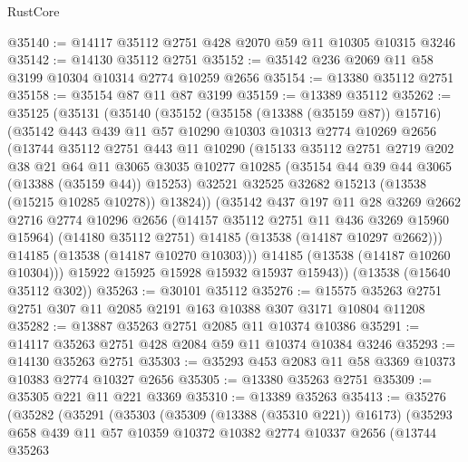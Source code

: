 \begin{lexlean}{RustCore}
\begin{coremodule}
@35140 := @14117 @35112 @2751 @428 @2070 @59 @11 @10305 @10315 @3246
@35142 := @14130 @35112 @2751
@35152 := @35142 @236 @2069 @11 @58 @3199 @10304 @10314 @2774 @10259 @2656
@35154 := @13380 @35112 @2751
@35158 := @35154 @87 @11 @87 @3199
@35159 := @13389 @35112
@35262 := @35125
    (@35131
      (@35140
        (@35152
          (@35158 (@13388 (@35159 @87)) @15716)
          (@35142
            @443
            @439
            @11
            @57
            @10290
            @10303
            @10313
            @2774
            @10269
            @2656
            (@13744
              @35112
              @2751
              @443
              @11
              @10290
              (@15133
                @35112
                @2751
                @2719
                @202
                @38
                @21
                @64
                @11
                @3065
                @3035
                @10277
                @10285
                (@35154 @44 @39 @44 @3065 (@13388 (@35159 @44)) @15253)
                @32521
                @32525
                @32682
                @15213
                (@13538 (@15215 @10285 @10278))
                @13824))
            (@35142
              @437
              @197
              @11
              @28
              @3269
              @2662
              @2716
              @2774
              @10296
              @2656
              (@14157 @35112 @2751 @11 @436 @3269 @15960 @15964)
              (@14180 @35112 @2751)
              @14185
              (@13538 (@14187 @10297 @2662)))
            @14185
            (@13538 (@14187 @10270 @10303)))
          @14185
          (@13538 (@14187 @10260 @10304)))
        @15922
        @15925
        @15928
        @15932
        @15937
        @15943))
    (@13538 (@15640 @35112 @302))
@35263 := @30101 @35112
@35276 := @15575 @35263 @2751 @2751 @307 @11 @2085 @2191 @163 @10388 @307 @3171 @10804 @11208
@35282 := @13887 @35263 @2751 @2085 @11 @10374 @10386
@35291 := @14117 @35263 @2751 @428 @2084 @59 @11 @10374 @10384 @3246
@35293 := @14130 @35263 @2751
@35303 := @35293 @453 @2083 @11 @58 @3369 @10373 @10383 @2774 @10327 @2656
@35305 := @13380 @35263 @2751
@35309 := @35305 @221 @11 @221 @3369
@35310 := @13389 @35263
@35413 := @35276
    (@35282
      (@35291
        (@35303
          (@35309 (@13388 (@35310 @221)) @16173)
          (@35293
            @658
            @439
            @11
            @57
            @10359
            @10372
            @10382
            @2774
            @10337
            @2656
            (@13744
              @35263

\end{coremodule}
\end{lexlean}
